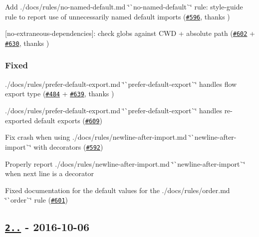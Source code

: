 \begin{DoxyItemize}
\item Add ./docs/rules/no-\/named-\/default.md \char`\"{}\`{}no-\/named-\/default\`{}\char`\"{} rule\+: style-\/guide rule to report use of unnecessarily named default imports (\href{https://github.com/benmosher/eslint-plugin-import/pull/596}{\tt \#596}, thanks \href{https://github.com/ntdb}{\tt })
\item \mbox{[}{\ttfamily no-\/extraneous-\/dependencies}\mbox{]}\+: check globs against C\+WD + absolute path (\href{https://github.com/benmosher/eslint-plugin-import/issues/602}{\tt \#602} + \href{https://github.com/benmosher/eslint-plugin-import/pull/630}{\tt \#630}, thanks \href{https://github.com/ljharb}{\tt })
\end{DoxyItemize}

\subsubsection*{Fixed}


\begin{DoxyItemize}
\item ./docs/rules/prefer-\/default-\/export.md \char`\"{}\`{}prefer-\/default-\/export\`{}\char`\"{} handles flow {\ttfamily export type} (\href{https://github.com/benmosher/eslint-plugin-import/issues/484}{\tt \#484} + \href{https://github.com/benmosher/eslint-plugin-import/pull/639}{\tt \#639}, thanks \href{https://github.com/jakubsta}{\tt })
\item ./docs/rules/prefer-\/default-\/export.md \char`\"{}\`{}prefer-\/default-\/export\`{}\char`\"{} handles re-\/exported default exports (\href{https://github.com/benmosher/eslint-plugin-import/issues/609}{\tt \#609})
\item Fix crash when using ./docs/rules/newline-\/after-\/import.md \char`\"{}\`{}newline-\/after-\/import\`{}\char`\"{} with decorators (\href{https://github.com/benmosher/eslint-plugin-import/issues/592}{\tt \#592})
\item Properly report ./docs/rules/newline-\/after-\/import.md \char`\"{}\`{}newline-\/after-\/import\`{}\char`\"{} when next line is a decorator
\item Fixed documentation for the default values for the ./docs/rules/order.md \char`\"{}\`{}order\`{}\char`\"{} rule (\href{https://github.com/benmosher/eslint-plugin-import/issues/601}{\tt \#601})
\end{DoxyItemize}

\subsection*{\href{https://github.com/benmosher/eslint-plugin-import/compare/v2.0.0...v2.0.1}{\tt 2..} -\/ 2016-\/10-\/06}


